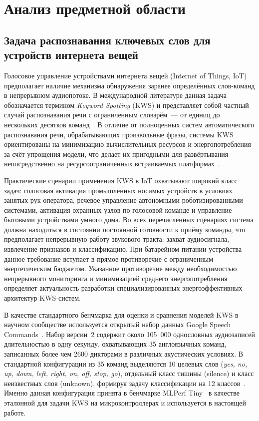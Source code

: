 
\section{Анализ предметной области}

\subsection{Задача распознавания ключевых слов для устройств интернета вещей}

Голосовое управление устройствами интернета вещей (Internet of Things, IoT)
предполагает наличие механизма обнаружения заранее определённых
слов-команд в непрерывном аудиопотоке. В международной литературе данная
задача обозначается термином \textit{Keyword Spotting} (KWS) и
представляет собой частный случай распознавания речи с ограниченным
словарём~--- от единиц до нескольких десятков команд~\cite{src:1}. В
отличие от полноценных систем автоматического распознавания речи,
обрабатывающих произвольные фразы, системы KWS ориентированы на
минимизацию вычислительных ресурсов и энергопотребления за счёт упрощения
модели, что делает их пригодными для развёртывания непосредственно на
ресурсоограниченных встраиваемых платформах~\cite{src:1, src:8}.

Практические сценарии применения KWS в IoT охватывают широкий класс
задач: голосовая активация промышленных носимых устройств в условиях
занятых рук оператора, речевое управление автономными роботизированными
системами, активация охранных узлов по голосовой команде и управление
бытовыми устройствами умного дома. Во всех перечисленных сценариях
система должна находиться в состоянии постоянной готовности к приёму
команды, что предполагает непрерывную работу звукового тракта: захват
аудиосигнала, извлечение признаков и классификацию. При батарейном
питании устройства данное требование вступает в прямое противоречие с
ограниченным энергетическим бюджетом. Указанное противоречие между
необходимостью непрерывного мониторинга и минимизацией среднего
энергопотребления определяет актуальность разработки специализированных
энергоэффективных архитектур KWS-систем.

В качестве стандартного бенчмарка для оценки и сравнения моделей KWS в
научном сообществе используется открытый набор данных Google Speech
Commands~\cite{src:2}. Набор версии~2 содержит около 105~000 однословных
аудиозаписей длительностью в одну секунду, охватывающих 35 англоязычных
команд, записанных более чем 2600 дикторами в различных акустических
условиях. В стандартной конфигурации из 35 команд выделяются 10 целевых
слов (\textit{yes, no, up, down, left, right, on, off, stop, go}),
отдельный класс тишины (silence) и класс неизвестных слов (unknown),
формируя задачу классификации на 12 классов~\cite{src:2}. Именно данная
конфигурация принята в бенчмарке MLPerf Tiny~\cite{src:5} в качестве
эталонной для задачи KWS на микроконтроллерах и используется в настоящей
работе.

